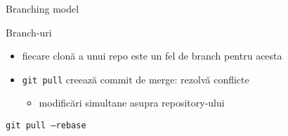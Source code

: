 \documentclass{beamer}
\begin{document}
\begin{frame}{Branching model}
  \begin{center}
  \end{center}
\end{frame}

\begin{frame}{Branch-uri}
  \begin{itemize}
    \item fiecare clonă a unui repo este un fel de branch pentru acesta
    \item \texttt{git pull} creează commit de merge: rezolvă conflicte
      \begin{itemize}
	\item modificări simultane asupra repository-ului
      \end{itemize}
  \end{itemize}
\end{frame}

\begin{frame}{\texttt{git pull --rebase}}
  \begin{center}
  \end{center}
\end{frame}


\end{document}
